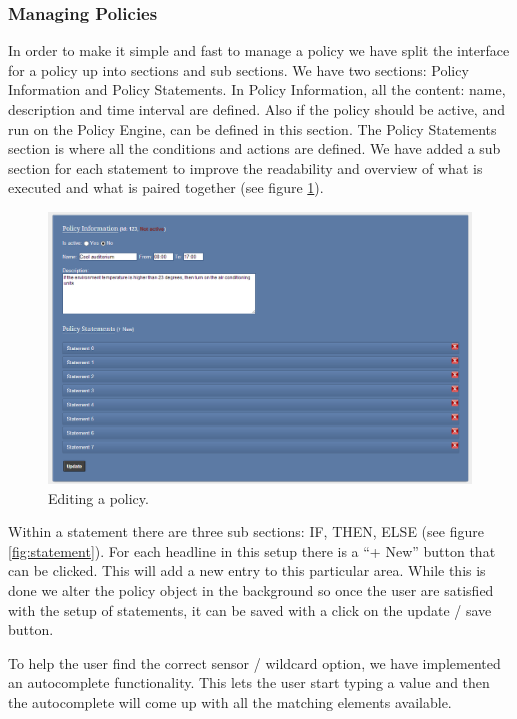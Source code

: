 \subsubsection{Managing Policies}
In order to make it simple and fast to manage a policy we have split the interface for a policy up into sections and sub sections. We have two sections: Policy Information and Policy Statements. In Policy Information, all the content: name, description and time interval are defined. Also if the policy should be active, and run on the Policy Engine, can be defined in this section. The Policy Statements section is where all the conditions and actions are defined. We have added a sub section for each statement to improve the readability and overview of what is executed and what is paired together (see figure \ref{fig:policy}).  

\begin{figure}[ht]
\centering
\includegraphics[width=\columnwidth]{policy.png}
\caption{Editing a policy.}
\label{fig:policy}
\end{figure}

Within a statement there are three sub sections: IF, THEN, ELSE (see figure \ref{fig:statement}). For each headline in this setup there is a "`+ New"' button that can be clicked. This will add a new entry to this particular area. While this is done we alter the policy object in the background so once the user are satisfied with the setup of statements, it can be saved with a click on the update / save button.

To help the user find the correct sensor / wildcard option, we have implemented an autocomplete functionality. This lets the user start typing a value and then the autocomplete will come up with all the matching elements available.

